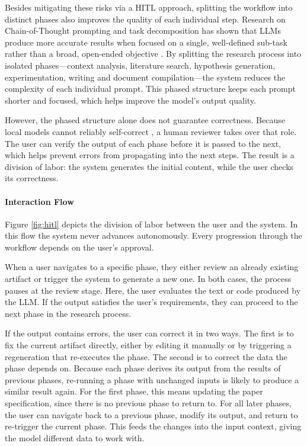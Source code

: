 Besides mitigating these risks via a HITL approach, splitting the workflow into distinct phases also improves the quality of each individual step. 
Research on Chain-of-Thought prompting and task decomposition has shown that LLMs produce more accurate results 
when focused on a single, well-defined sub-task rather than a broad, open-ended objective \cite{Wei2022}. 
By splitting the research process into isolated phases---context analysis, literature search, hypothesis generation, 
experimentation, writing and document compilation---the system reduces the complexity of each individual prompt.
This phased structure keeps each prompt shorter and focused, which helps improve the model's output quality. 

However, the phased structure alone does not guarantee correctness. Because local models cannot reliably 
self-correct \cite{Huang2023LargeLM}, a human reviewer takes over that role. The user can verify the output of each phase before it is passed 
to the next, which helps prevent errors from propagating into the next steps. 
The result is a division of labor: the system generates the initial content, while the user checks its correctness.


\paragraph{Interaction Flow}
Figure \ref{fig:hitl} depicts the division of labor between the user and the system. 
In this flow the system never advances autonomously. 
Every progression through the workflow depends on the user's approval.

When a user navigates to a specific phase, they either review an already existing artifact or trigger the system to generate a new one. 
In both cases, the process pauses at the review stage. Here, the user evaluates the text or code produced by the LLM. 
If the output satisfies the user's requirements, they can proceed to the next phase in the research process.

If the output contains errors, the user can correct it in two ways.
The first is to fix the current artifact directly, either by editing it manually or by triggering a regeneration that re-executes the phase.
The second is to correct the data the phase depends on.
Because each phase derives its output from the results of previous phases, re-running a phase with unchanged inputs is likely to produce a similar result again.
For the first phase, this means updating the paper specification, since there is no previous phase to return to.
For all later phases, the user can navigate back to a previous phase, modify its output, and return to re-trigger the current phase.
This feeds the changes into the input context, giving the model different data to work with.

